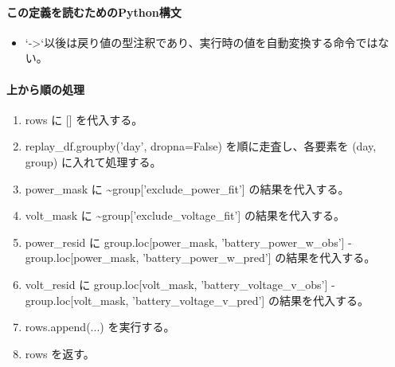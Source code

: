 \documentclass[a4paper,11pt]{article}
\begin{document}
            \paragraph{この定義を読むためのPython構文}
            \begin{itemize}[leftmargin=1.6em]
            \item `->`以後は戻り値の型注釈であり、実行時の値を自動変換する命令ではない。
            \end{itemize}
            \paragraph{上から順の処理}
            \begin{enumerate}[leftmargin=1.8em]
            \item rows に [] を代入する。
\item replay\_df.groupby('day', dropna=False) を順に走査し、各要素を (day, group) に入れて処理する。
\item   power\_mask に \textasciitilde{}group['exclude\_power\_fit'] の結果を代入する。
\item   volt\_mask に \textasciitilde{}group['exclude\_voltage\_fit'] の結果を代入する。
\item   power\_resid に group.loc[power\_mask, 'battery\_power\_w\_obs'] - group.loc[power\_mask, 'battery\_power\_w\_pred'] の結果を代入する。
\item   volt\_resid に group.loc[volt\_mask, 'battery\_voltage\_v\_obs'] - group.loc[volt\_mask, 'battery\_voltage\_v\_pred'] の結果を代入する。
\item   rows.append(...) を実行する。
\item rows を返す。
            \end{enumerate}
\end{document}
